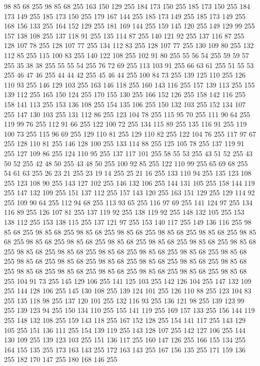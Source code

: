 98 85 68 255 98 85 68 255 163 150 129 255 184 173 150 255 185 173 150 255 184 173 149 255 185 173 150 255 179 167 144 255 185 173 149 255 185 173 149 255 168 156 133 255 164 152 129 255 181 169 144 255 159 145 120 255 149 129 99 255 157 138 108 255 137 118 91 255 135 114 87 255 140 121 92 255 137 116 87 255 128 107 78 255 128 107 77 255 134 112 83 255 128 107 77 255 130 109 80 255 132 112 85 255 115 100 83 255 140 122 108 255 102 91 80 255 55 56 54 255 59 59 57 255 35 38 38 255 55 55 54 255 76 72 69 255 113 103 91 255 66 63 61 255 51 55 53 255 46 47 46 255 44 44 42 255 45 46 44 255 100 84 73 255 139 125 110 255 126 110 93 255 146 129 103 255 163 146 118 255 160 143 116 255 157 139 113 255 155 139 112 255 165 150 124 255 170 155 130 255 166 152 126 255 158 142 116 255 158 141 113 255 153 136 108 255 154 135 106 255 150 132 103 255 152 134 107 255 147 130 103 255 131 112 86 255 123 104 78 255 115 95 70 255 111 90 64 255 119 99 76 255 112 91 66 255
122 100 72 255 134 115 89 255 135 116 91 255 119 100 73 255 115 96 69 255 129 110 81 255 129 110 82 255 122 104 76 255 117 97 67 255 128 110 81 255 146 128 100 255 133 114 88 255 125 105 78 255 137 119 91 255 127 109 86 255 124 110 95 255 137 117 101 255 58 55 53 255 43 51 52 255 43 50 52 255 42 48 50 255 43 48 50 255 100 92 85 255 122 110 99 255 65 69 68 255 54 61 63 255 26 23 21 255 23 19 14 255 25 21 16 255 133 110 94 255 135 123 108 255 123 108 90 255 143 127 102 255 146 132 106 255 144 131 105 255 158 144 119 255 147 132 109 255 151 137 112 255 157 143 120 255 163 151 129 255 129 114 92 255 109 90 64 255 112 94 68 255 113 93 65 255 116 97 69 255 141 124 97 255 134 116 89 255 126 107 81 255 137 119 92 255 138 119 92 255 148 132 105 255 153 138 112 255 153 138 115 255 137 121 97 255 153 140 117 255 149 136 116 255 98 85 68 255 98 85 68 255 98 85 68 255 98 85 68 255 98 85 68 255 98 85 68 255 98 85 68 255 98 85 68 255
98 85 68 255 98 85 68 255 98 85 68 255 98 85 68 255 98 85 68 255 98 85 68 255 98 85 68 255 98 85 68 255 98 85 68 255 98 85 68 255 98 85 68 255 98 85 68 255 98 85 68 255 98 85 68 255 98 85 68 255 98 85 68 255 98 85 68 255 98 85 68 255 98 85 68 255 98 85 68 255 98 85 68 255 98 85 68 255 98 85 68 255 104 91 73 255 145 129 106 255 141 125 103 255 142 126 104 255 147 132 109 255 144 128 106 255 145 130 108 255 139 124 101 255 126 110 88 255 123 104 83 255 135 118 98 255 137 120 101 255 132 116 93 255 136 121 98 255 139 123 99 255 139 123 94 255 150 134 110 255 155 141 119 255 169 157 133 255 156 144 119 255 148 132 108 255 159 143 118 255 167 152 128 255 154 141 117 255 143 129 105 255 151 136 111 255 154 139 119 255 143 128 107 255 142 127 106 255 144 130 109 255 139 123 103 255 151 136 117 255 160 147 126 255 166 155 134 255 164 155 135 255 173 163 143 255 172 163 143 255 167 156 135 255 171 159 136 255 182 170 147 255 180 168 146 255
